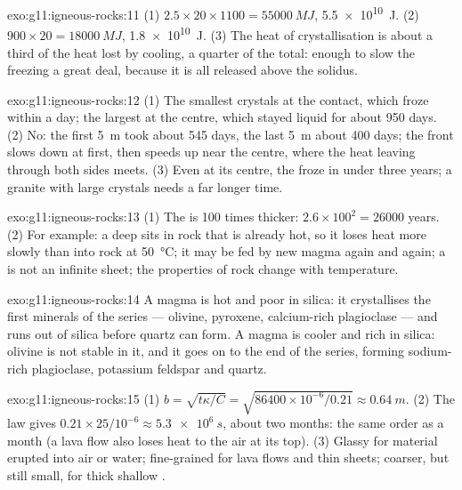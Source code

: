 \begin{solution}{exo:g11:igneous-rocks:11}
(1) $2.5 \times 20 \times 1100 = \qty{55000}{MJ}$, \qty{5.5e10}{J}.
(2) $900 \times 20 = \qty{18000}{MJ}$, \qty{1.8e10}{J}. (3) The heat of
crystallisation is about a third of the heat lost by cooling, a quarter of
the total: enough to slow the freezing a great deal, because it is all
released above the solidus.
\end{solution}

\begin{solution}{exo:g11:igneous-rocks:12}
(1) The smallest crystals at the contact, which froze within a day; the
largest at the centre, which stayed liquid for about 950 days. (2) No: the
first \qty{5}{m} took about 545 days, the last \qty{5}{m} about 400 days; the
front slows down at first, then speeds up near the centre, where the heat
leaving through both sides meets. (3) Even at its centre, the  froze in
under three years; a granite with large crystals needs a far longer time.
\end{solution}

\begin{solution}{exo:g11:igneous-rocks:13}
(1) The  is 100 times thicker: $2.6 \times 100^2 = \num{26000}$
years. (2) For example: a deep  sits in rock that is already hot, so
it loses heat more slowly than into rock at \qty{50}{\degreeCelsius}; it may
be fed by new magma again and again; a  is not an infinite sheet;
the properties of rock change with temperature.
\end{solution}

\begin{solution}{exo:g11:igneous-rocks:14}
A  magma is hot and poor in silica: it crystallises the first minerals
of the series --- olivine, pyroxene, calcium-rich plagioclase --- and runs out
of silica before quartz can form. A  magma is cooler and rich in
silica: olivine is not stable in it, and it goes on to the end of the
series, forming sodium-rich plagioclase, potassium feldspar and quartz.
\end{solution}

\begin{solution}{exo:g11:igneous-rocks:15}
(1) $b = \sqrt{t\kappa/C} = \sqrt{86400 \times 10^{-6}/0.21} \approx
\qty{0.64}{m}$. (2) The law gives $0.21 \times 25/10^{-6} \approx
\qty{5.3e6}{s}$, about two months: the same order as a month (a lava flow
also loses heat to the air at its top). (3) Glassy for material erupted into
air or water; fine-grained for lava flows and thin sheets; coarser, but still
small, for thick shallow .
\end{solution}

